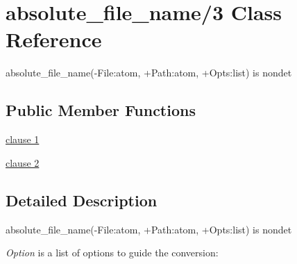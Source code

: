 \section{absolute\+\_\+file\+\_\+name/3 Class Reference}
\label{classabsolute__file__name_23}


absolute\+\_\+file\+\_\+name(-\/\+File\+:atom, +\+Path\+:atom, +\+Opts\+:list) is nondet  


\subsection*{Public Member Functions}
\begin{DoxyCompactItemize}
\item 
\hyperlink{classabsolute__file__name_23_a845fb2035e0e1bdb1624e12a8c1d8f71}{clause 1}
\item 
\hyperlink{classabsolute__file__name_23_ab355cd5afcfff6ba4d356db938847b54}{clause 2}
\end{DoxyCompactItemize}


\subsection{Detailed Description}
absolute\+\_\+file\+\_\+name(-\/\+File\+:atom, +\+Path\+:atom, +\+Opts\+:list) is nondet 

{\itshape Option} is a list of options to guide the conversion\+:


